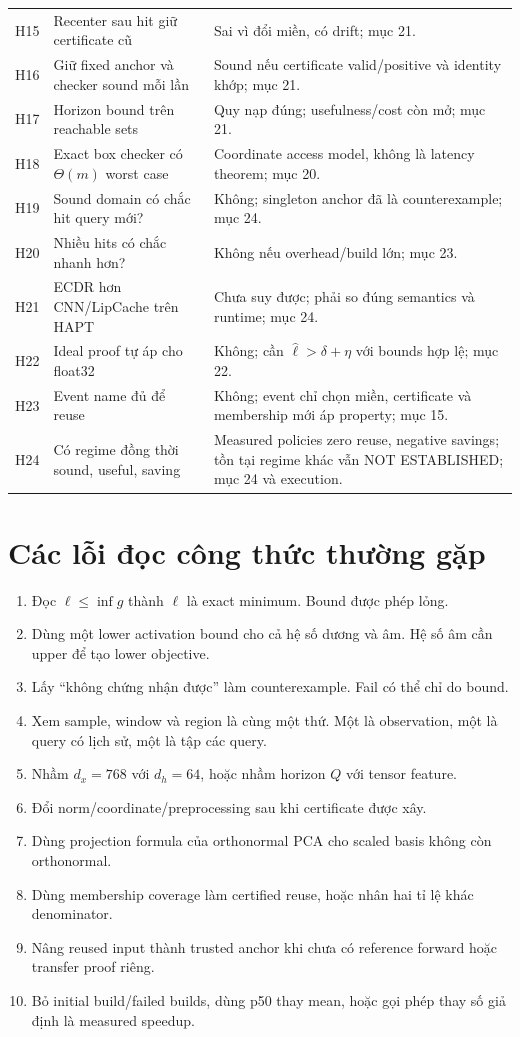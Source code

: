 \documentclass[11pt,a4paper]{article}
\theoremstyle{definition}
\begin{document}
\begin{longtable}{@{}p{0.85cm}p{6.9cm}p{5.8cm}@{}}
H15 & Recenter sau hit giữ certificate cũ & Sai vì đổi miền, có drift;
mục 21.\\
H16 & Giữ fixed anchor và checker sound mỗi lần & Sound nếu certificate
valid/positive và identity khớp; mục 21.\\
H17 & Horizon bound trên reachable sets & Quy nạp đúng; usefulness/cost
còn mở; mục 21.\\
H18 & Exact box checker có $\Theta(m)$ worst case & Coordinate access model,
không là latency theorem; mục 20.\\
H19 & Sound domain có chắc hit query mới? & Không; singleton anchor đã là
counterexample; mục 24.\\
H20 & Nhiều hits có chắc nhanh hơn? & Không nếu overhead/build lớn;
mục 23.\\
H21 & ECDR hơn CNN/LipCache trên HAPT & Chưa suy được; phải so đúng semantics
và runtime; mục 24.\\
H22 & Ideal proof tự áp cho float32 & Không; cần $\widehat\ell>\delta+\eta$
với bounds hợp lệ; mục 22.\\
H23 & Event name đủ để reuse & Không; event chỉ chọn miền, certificate và
membership mới áp property; mục 15.\\
H24 & Có regime đồng thời sound, useful, saving & Measured policies zero reuse, negative savings; tồn tại regime khác vẫn NOT ESTABLISHED; mục 24 và execution.\\\bottomrule
\end{longtable}

\section{Các lỗi đọc công thức thường gặp}
\begin{enumerate}
\item Đọc $\ell\le\inf g$ thành $\ell$ là exact minimum. Bound được phép lỏng.
\item Dùng một lower activation bound cho cả hệ số dương và âm. Hệ số âm
cần upper để tạo lower objective.
\item Lấy ``không chứng nhận được'' làm counterexample. Fail có thể chỉ do bound.
\item Xem sample, window và region là cùng một thứ. Một là observation,
một là query có lịch sử, một là tập các query.
\item Nhầm $d_x=768$ với $d_h=64$, hoặc nhầm horizon $Q$ với tensor feature.
\item Đổi norm/coordinate/preprocessing sau khi certificate được xây.
\item Dùng projection formula của orthonormal PCA cho scaled basis không
còn orthonormal.
\item Dùng membership coverage làm certified reuse, hoặc nhân hai tỉ lệ
khác denominator.
\item Nâng reused input thành trusted anchor khi chưa có reference forward
hoặc transfer proof riêng.
\item Bỏ initial build/failed builds, dùng p50 thay mean, hoặc gọi phép thay
số giả định là measured speedup.
\end{enumerate}
\end{document}
